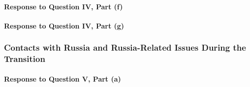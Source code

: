 \paragraph{Response to Question IV, Part (f)}

\paragraph{Response to Question IV, Part (g)}

\subsubsection{Contacts with Russia and Russia-Related Issues During the Transition}

\paragraph{Response to Question V, Part (a)}

